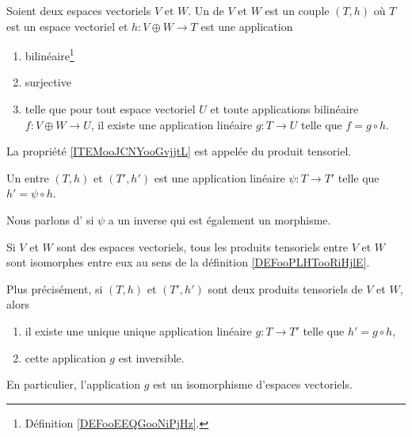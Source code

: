 \begin{definition}       \label{DEFooXKKQooAvWRNp}
    Soient deux espaces vectoriels \( V\) et \( W\). Un  de \( V\) et \( W\) est un couple \( (T,h)\) où \( T\) est un espace vectoriel et \( h\colon V\oplus W\to T\) est une application
    \begin{enumerate}
        \item
            bilinéaire\footnote{Définition \ref{DEFooEEQGooNiPjHz}.}
        \item
            surjective
        \item       \label{ITEMooJCNYooGvjjtL}
            telle que pour tout espace vectoriel \( U\) et toute applications bilinéaire \( f\colon V\oplus W\to U\), il existe une application linéaire \( g\colon T\to U\) telle que \( f=g\circ h\).
    \end{enumerate}
    La propriété \ref{ITEMooJCNYooGvjjtL} est appelée  du produit tensoriel.
\end{definition}

\begin{definition}  \label{DEFooPLHTooRiHjlE}
    Un  entre \( (T,h)\) et \( (T',h')\) est une application linéaire \( \psi\colon T\to T'\) telle que \( h'=\psi\circ h\).

    Nous parlons d' si \( \psi\) a un inverse qui est également un morphisme.
\end{definition}

\begin{proposition}      \label{PROPooROPHooQXqNzZ}
    Si \( V\) et \( W\) sont des espaces vectoriels, tous les produits tensoriels entre \( V\) et \( W\) sont isomorphes entre eux au sens de la définition \ref{DEFooPLHTooRiHjlE}.

    Plus précisément, si \( (T,h)\) et \( (T',h')\) sont deux produits tensoriels de \( V\) et \( W\), alors 
    \begin{enumerate}
        \item
            il existe une unique unique application linéaire \( g\colon T\to T'\) telle que \( h'=g\circ h\),
        \item
            cette application \( g\) est inversible.
    \end{enumerate}
    En particulier, l'application \( g\) est un isomorphisme d'espaces vectoriels.
\end{proposition}

